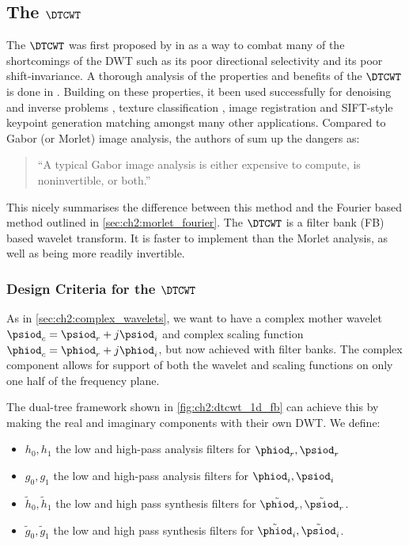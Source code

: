 \subsection{The $\DTCWT$}
  The $\DTCWT$ was first proposed by \citeauthor{kingsbury_dual-tree_1998} in
  \cite{kingsbury_dual-tree_1998, kingsbury_dual-tree_1998-1} as a way to combat
  many of the shortcomings of the DWT such as its poor directional
  selectivity and its poor shift-invariance. A thorough analysis of the
  properties and benefits of the $\DTCWT$ is done in
  \cite{kingsbury_image_1999,selesnick_dual-tree_2005}. Building on these
  properties, it been used
  successfully for denoising and inverse problems \cite{rivaz_bayesian_2001,
  zhang_bayesian_2008, zhang_variational_2015, miller_image_2008}, texture
  classification \cite{hatipoglu_texture_1999, rivaz_complex_1999}, image
  registration \cite{loo_motion-estimation-based_2001, chen_efficient_2012}
  and SIFT-style keypoint generation matching \cite{fauqueur_multiscale_2006,
  anderson_determining_2005, anderson_rotation-invariant_2006,
  bendale_multiscale_2010, ng_robust_2012} amongst many other applications.
  Compared to Gabor (or Morlet) image analysis, the authors of
  \cite{selesnick_dual-tree_2005} sum up the dangers as:
  \begin{quote}
    ``A typical Gabor image analysis is either expensive to compute, is
    noninvertible, or both.''
  \end{quote}
  This nicely summarises the difference between this method and the Fourier
  based method outlined in \autoref{sec:ch2:morlet_fourier}. The $\DTCWT$ is
  a filter bank (FB) based wavelet transform. It is faster
  to implement than the Morlet analysis, as well as being more readily invertible.

\subsubsection{Design Criteria for the $\DTCWT$}
  As in \autoref{sec:ch2:complex_wavelets}, we want to have a complex mother
  wavelet $\psiod_c = \psiod_r + j\psiod_i$ and complex scaling function $\phiod_c =
  \phiod_r + j\phiod_i$, but now achieved with filter banks. The complex component
  allows for support of both the wavelet and scaling functions on only one half of
  the frequency plane.

  The dual-tree framework shown in \autoref{fig:ch2:dtcwt_1d_fb} can achieve this
  by making the real and imaginary components with their own DWT.
  We define:
  \begin{itemize}
    \item $h_0, h_1$ the low and high-pass analysis filters for $\phiod_r, \psiod_r$
    \item $g_0, g_1$ the low and high-pass analysis filters for $\phiod_i, \psiod_i$
    \item $\tilde{h}_0, \tilde{h}_1$ the low and high pass synthesis filters
      for $\tilde{\phiod}_r, \tilde{\psiod}_r$.
    \item $\tilde{g}_0, \tilde{g}_1$ the low and high pass synthesis filters for
      $\tilde{\phiod}_i, \tilde{\psiod}_i$.
  \end{itemize}

